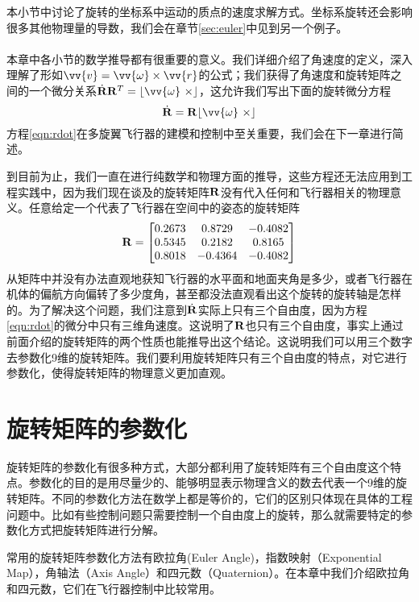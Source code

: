 \documentclass[11pt]{article}
\begin{document}
本小节中讨论了旋转的坐标系中运动的质点的速度求解方式。坐标系旋转还会影响很多其他物理量的导数，我们会在章节\ref{sec:euler}中见到另一个例子。
\ \\
\ \\

本章中各小节的数学推导都有很重要的意义。我们详细介绍了角速度的定义，深入理解了形如$\vv{v} = \vv{\omega} \times \vv{r}$的公式；我们获得了角速度和旋转矩阵之间的一个微分关系$\dot{{\bf R}}{\bf R}^T = \lfloor \vv{\omega} \ \times \rfloor$，这允许我们写出下面的旋转微分方程
\begin{equation}\label{eqn:rdot}
\dot{{\bf R}} = {\bf R}\lfloor \vv{\omega} \ \times \rfloor
\end{equation}
方程\ref{eqn:rdot}在多旋翼飞行器的建模和控制中至关重要，我们会在下一章进行简述。

到目前为止，我们一直在进行纯数学和物理方面的推导，这些方程还无法应用到工程实践中，因为我们现在谈及的旋转矩阵${\bf R}$没有代入任何和飞行器相关的物理意义。任意给定一个代表了飞行器在空间中的姿态的旋转矩阵
$$
{\bf R} = 
\begin{bmatrix}
0.2673 & 0.8729 & -0.4082 \\
0.5345 & 0.2182 & 0.8165 \\
0.8018 & -0.4364 & -0.4082
\end{bmatrix}
$$
从矩阵中并没有办法直观地获知飞行器的水平面和地面夹角是多少，或者飞行器在机体的偏航方向偏转了多少度角，甚至都没法直观看出这个旋转的旋转轴是怎样的。为了解决这个问题，我们注意到$\dot{{\bf R}}$实际上只有三个自由度，因为方程\ref{eqn:rdot}的微分中只有三维角速度。这说明了${\bf R}$也只有三个自由度，事实上通过前面介绍的旋转矩阵的两个性质也能推导出这个结论。这说明我们可以用三个数字去参数化9维的旋转矩阵。我们要利用旋转矩阵只有三个自由度的特点，对它进行参数化，使得旋转矩阵的物理意义更加直观。

\section{旋转矩阵的参数化}
旋转矩阵的参数化有很多种方式，大部分都利用了旋转矩阵有三个自由度这个特点。参数化的目的是用尽量少的、能够明显表示物理含义的数去代表一个9维的旋转矩阵。不同的参数化方法在数学上都是等价的，它们的区别只体现在具体的工程问题中。比如有些控制问题只需要控制一个自由度上的旋转，那么就需要特定的参数化方式把旋转矩阵进行分解。

常用的旋转矩阵参数化方法有欧拉角(Euler Angle)，指数映射（Exponential Map），角轴法（Axis Angle）和四元数（Quaternion）。在本章中我们介绍欧拉角和四元数，它们在飞行器控制中比较常用。
\end{document}
